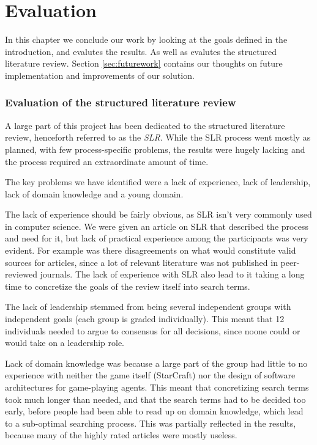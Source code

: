 
\chapter{Evaluation}
In this chapter we conclude our work by looking at the goals defined in the introduction, and evalutes the results. As well as evalutes the structured literature review. Section \ref{sec:futurework} contains our thoughts on future implementation and improvements of our solution.

\subsection{Evaluation of the structured literature review}
A large part of this project has been dedicated to the structured literature
review, henceforth referred to as the \textit{SLR}. While the SLR process went
mostly as planned, with few process-specific problems, the results were hugely
lacking and the process required an extraordinate amount of time.

The key problems we have identified were a lack of experience, lack of
leadership, lack of domain knowledge and a young domain.

The lack of experience should be fairly obvious, as SLR isn't very commonly
used in computer science. We were given an article on SLR that described the
process and need for it, but lack of practical experience among the
participants was very evident. For example was there disagreements on what
would constitute valid sources for articles, since a lot of relevant literature
was not published in peer-reviewed journals. The lack of
experience with SLR also lead to it taking a long time to concretize the goals
of the review itself into search terms.

The lack of leadership stemmed from being several independent groups with
independent goals (each group is graded individually). This meant that 12
individuals needed to argue to consensus for all decisions, since noone could
or would take on a leadership role.

Lack of domain knowledge was because a large part of the group had little to no
experience with neither the game itself (StarCraft) nor the design of software
architectures for game-playing agents. This meant that concretizing search
terms took much longer than needed, and that the search terms had to be decided
too early, before people had been able to read up on domain knowledge, which
lead to a sub-optimal searching process. This was partially reflected in the
results, because many of the highly rated articles were mostly useless.

